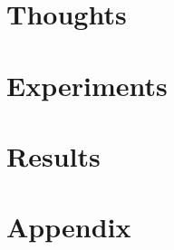 




\frenchspacing
\raggedbottom
{} %
\pagestyle{plain}
%


\cleardoublepage
\pagestyle{scrheadings}
\cleardoublepage
\cleardoublepage\part{Thoughts}


\cleardoublepage\part{Experiments}


\cleardoublepage\part{Results}


\appendix
\cleardoublepage\part{Appendix}
%

\cleardoublepage


